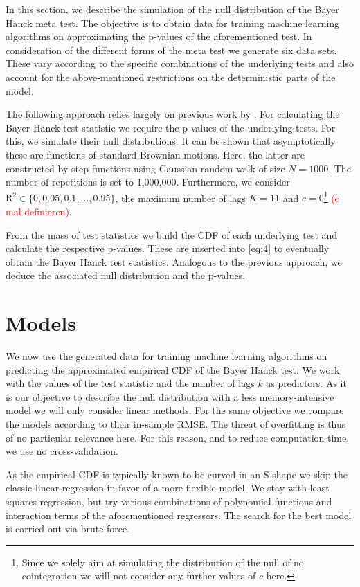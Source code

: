 \documentclass[12pt,a4paper]{article}
\let\rmarkdownfootnote\footnote%
\def\footnote{\protect\rmarkdownfootnote}
\begin{document}
In this section, we describe the simulation of the null distribution of
the Bayer Hanck meta test. The objective is to obtain data for training
machine learning algorithms on approximating the p-values of the
aforementioned test. In consideration of the different forms of the meta
test we generate six data sets. These vary according to the specific
combinations of the underlying tests and also account for the
above-mentioned restrictions on the deterministic parts of the model.

The following approach relies largely on previous work by
\textcite{Pesavento_2004}. For calculating the Bayer Hanck test
statistic we require the p-values of the underlying tests. For this, we
simulate their null distributions. It can be shown that asymptotically
these are functions of standard Brownian motions. Here, the latter are
constructed by step functions using Gaussian random walk of size
\(N = 1000\). The number of repetitions is set to 1,000,000.
Furthermore, we consider \(\text{R}^2 \in \{0, 0.05, 0.1, ..., 0.95\}\),
the maximum number of lags \(K = 11\) and \(c = 0\)\footnote{Since we
  solely aim at simulating the distribution of the null of no
  cointegration we will not consider any further values of \(c\) here.}
\textcolor{red}{(c mal definieren)}.

From the mass of test statistics we build the \ac{CDF} of each
underlying test and calculate the respective p-values. These are
inserted into \eqref{eq:4} to eventually obtain the Bayer Hanck test
statistics. Analogous to the previous approach, we deduce the associated
null distribution and the p-values.

\hypertarget{models}{%
\section{Models}\label{models}}

We now use the generated data for training machine learning algorithms
on predicting the approximated empirical \ac{CDF} of the Bayer Hanck
test. We work with the values of the test statistic and the number of
lags \(k\) as predictors. As it is our objective to describe the null
distribution with a less memory-intensive model we will only consider
linear methods. For the same objective we compare the models according
to their in-sample \ac{RMSE}. The threat of overfitting is thus of no
particular relevance here. For this reason, and to reduce computation
time, we use no cross-validation.

As the empirical \ac{CDF} is typically known to be curved in an S-shape
we skip the classic linear regression in favor of a more flexible model.
We stay with least squares regression, but try various combinations of
polynomial functions and interaction terms of the aforementioned
regressors. The search for the best model is carried out via
brute-force.
\end{document}
